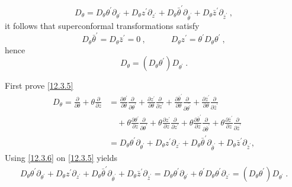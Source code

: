 \begin{equation}
	D_{\theta} = D_{\theta} \theta^{\prime} \partial_{\theta^{\prime}}
	+D_{\theta}z^{\prime}\partial_{z^{\prime}} + D_{\theta}\bar{\theta}^{\prime}\partial_{\bar{\theta}^{\prime}}
	+D_{\theta}\bar{z}^{\prime}\partial_{\bar{z}^{\prime}} \:, \label{12.3.5}
\end{equation}
it follows that superconformal transformations satisfy
\begin{equation}
	D_{\theta}\bar{\theta}^{\prime}=D_{\theta}\bar{z}^{\prime}=0\:, \qquad \quad
	D_{\theta}z^{\prime} = \theta^{\prime}D_{\theta}\theta^{\prime} \:, \label{12.3.6}
\end{equation}
hence
\begin{equation}
	D_{\theta}= (D_{\theta}\theta^{\prime})D_{\theta^{\prime}} \:. \label{12.3.7}
\end{equation}
\begin{tcolorbox}[breakable]
	First prove \eqref{12.3.5}
	\begin{align*}
		D_{\theta} = \frac{\partial}{\partial \theta} + \theta \frac{\partial}{\partial z}
		&= \frac{\partial \theta^{\prime}}{\partial \theta} \frac{\partial}{\partial \theta^{\prime}}
		+ \frac{\partial z^{\prime}}{\partial \theta} \frac{\partial}{\partial z^{\prime}} 
		+\frac{\partial \bar{\theta}^{\prime}}{\partial \theta} \frac{\partial}{\partial \bar{\theta^{\prime}}}
		+ \frac{\partial \bar{z}^{\prime}}{\partial \theta} \frac{\partial}{\partial \bar{z}^{\prime}} \\
		&\quad+ \theta \frac{\partial \theta^{\prime}}{\partial z}\frac{\partial}{\partial \theta^{\prime}}
		+\theta \frac{\partial z^{\prime}}{\partial z}\frac{\partial}{\partial z^{\prime}}
		+ \theta \frac{\partial \bar{\theta}^{\prime}}{\partial z}\frac{\partial}{\partial \bar{\theta}^{\prime}}
		+\theta \frac{\partial \bar{z}^{\prime}}{\partial z}\frac{\partial}{\partial \bar{z}^{\prime}} \\
		&=D_{\theta} \theta^{\prime} \partial_{\theta^{\prime}}
		+D_{\theta}z^{\prime}\partial_{z^{\prime}} + D_{\theta}\bar{\theta}^{\prime}\partial_{\bar{\theta}^{\prime}}
		+D_{\theta}\bar{z}^{\prime}\partial_{\bar{z}^{\prime}} ,
	\end{align*}
	Using \eqref{12.3.6} on \eqref{12.3.5} yields
	\begin{align*}
		D_{\theta} \theta^{\prime} \partial_{\theta^{\prime}}
		+D_{\theta}z^{\prime}\partial_{z^{\prime}} + D_{\theta}\bar{\theta}^{\prime}\partial_{\bar{\theta}^{\prime}}
		+D_{\theta}\bar{z}^{\prime}\partial_{\bar{z}^{\prime}}
		=D_{\theta} \theta^{\prime} \partial_{\theta^{\prime}}
		+\theta^{\prime}D_{\theta}\theta^{\prime}\partial_{z^{\prime}}=(D_{\theta}\theta^{\prime})D_{\theta^{\prime}}\:.
	\end{align*}
\end{tcolorbox}
